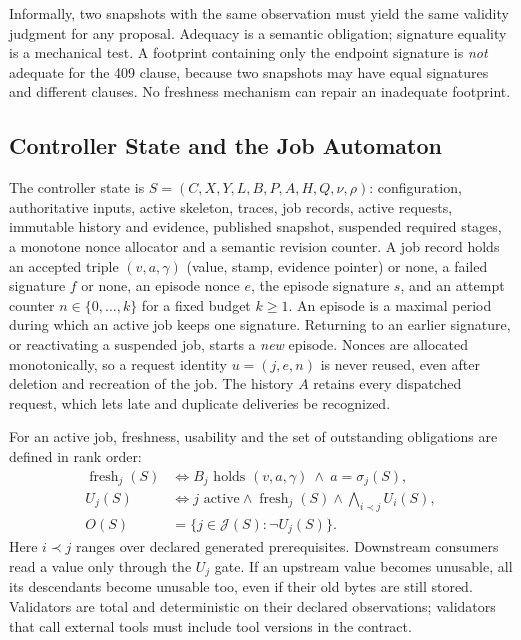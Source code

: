 \documentclass[10pt,journal,compsoc]{IEEEtran}
\theoremstyle{plain}
\theoremstyle{definition}
\newcommand{\Jobs}{\mathcal J}
\newcommand{\Sig}{\sigma}
\newcommand{\fresh}{\operatorname{fresh}}
\begin{document}
Informally, two snapshots with the same observation must yield the same validity judgment for any proposal. Adequacy is a semantic obligation; signature equality is a mechanical test. A footprint containing only the endpoint signature is \emph{not} adequate for the 409 clause, because two snapshots may have equal signatures and different clauses. No freshness mechanism can repair an inadequate footprint.

\subsection{Controller State and the Job Automaton}
The controller state is $S=(C,X,Y,L,B,P,A,H,Q,\nu,\rho)$: configuration, authoritative inputs, active skeleton, traces, job records, active requests, immutable history and evidence, published snapshot, suspended required stages, a monotone nonce allocator and a semantic revision counter. A job record holds an accepted triple $(v,a,\gamma)$ (value, stamp, evidence pointer) or none, a failed signature $f$ or none, an episode nonce $e$, the episode signature $s$, and an attempt counter $n\in\{0,\ldots,k\}$ for a fixed budget $k\ge1$. An episode is a maximal period during which an active job keeps one signature. Returning to an earlier signature, or reactivating a suspended job, starts a \emph{new} episode. Nonces are allocated monotonically, so a request identity $u=(j,e,n)$ is never reused, even after deletion and recreation of the job. The history $A$ retains every dispatched request, which lets late and duplicate deliveries be recognized.

For an active job, freshness, usability and the set of outstanding obligations are defined in rank order:
\begin{align}
\fresh_j(S)&\iff B_j\text{ holds }(v,a,\gamma)\ \land\ a=\Sig_j(S),\label{eq:fresh}\\
U_j(S)&\iff j\text{ active}\land\fresh_j(S)\land\textstyle\bigwedge_{i\prec j}U_i(S),\label{eq:usable}\\
O(S)&=\{j\in\Jobs(S):\neg U_j(S)\}.\label{eq:obligation}
\end{align}
Here $i\prec j$ ranges over declared generated prerequisites. Downstream consumers read a value only through the $U_j$ gate. If an upstream value becomes unusable, all its descendants become unusable too, even if their old bytes are still stored. Validators are total and deterministic on their declared observations; validators that call external tools must include tool versions in the contract.
\end{document}

